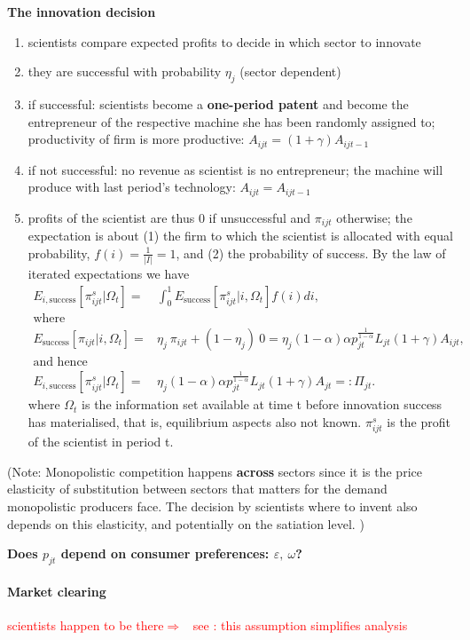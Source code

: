 \documentclass[12pt]{article}
\newcommand{\ar}{$\Rightarrow$ \ }
\newcommand{\tr}[1]{\textcolor{red}{#1}}
\begin{document}
\textbf{The innovation decision}
\begin{enumerate}
\item scientists compare expected profits to decide in which sector to innovate
\item they are successful with probability $\eta_j$ (sector dependent)
\item if successful: scientists become a \textbf{one-period patent} and become the entrepreneur of the respective machine she has been randomly assigned to; productivity of firm is more productive: $A_{ijt}=(1+\gamma)A_{ijt-1}$
\item if not successful: no revenue as scientist is no entrepreneur; the machine will produce with last period's  technology: $A_{ijt}=A_{ijt-1}$
\item profits of the scientist are thus 0 if unsuccessful and $\pi_{ijt}$ otherwise; the expectation is about (1) the firm to which the scientist is allocated with equal probability, $f(i)=\frac{1}{|I|}=1$, and (2) the probability of success. By the law of iterated expectations we have
\begin{align*}
E_{i,\text{success}}[\pi^s_{ijt}| \Omega_t]=& \int_{0}^{1}E_\text{success}[\pi^s_{ijt}|i, \Omega_t]f(i)di,\\ \text{where}&\\
E_\text{success}[\pi_{ijt}|i, \Omega_t]=& \eta_j\  \pi_{ijt}+(1-\eta_j)\ 0=\eta_j (1-\alpha)\alpha p_{jt}^\frac{1}{1-\alpha}L_{jt}(1+\gamma)A_{ijt},\\
\text{and hence}&\\
E_{i,\text{success}}[\pi^s_{ijt}| \Omega_t]=&\eta_j (1-\alpha)\alpha p_{jt}^\frac{1}{1-\alpha}L_{jt}(1+\gamma)A_{jt}=: \Pi_{jt}.
\end{align*}
where $\Omega_t$ is the information set available at time t before innovation success has materialised, that is, equilibrium aspects also not known. $\pi^s_{ijt}$ is the profit of the scientist in period t. 

\end{enumerate}
(Note: Monopolistic competition happens \textbf{across} sectors since it is the price elasticity of substitution between sectors that matters for the demand monopolistic producers face.
The decision by scientists where to invent also depends on this elasticity, and potentially on the satiation level. 
)


\textbf{Does $p_{jt}$ depend on consumer preferences: $\varepsilon,\ \omega$?}

\paragraph{Market clearing}
\tr{scientists happen to be there\ar see  \cite{Acemoglu2002DirectedChange}: this assumption simplifies analysis }
\end{document}
